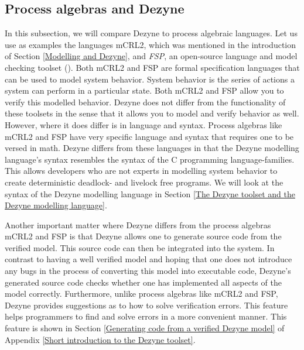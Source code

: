 \documentclass[12pt]{scrreprt}
\begin{document}
\subsection{Process algebras and Dezyne}
\label{Process algebras and Dezyne}
In this subsection, we will compare Dezyne to process algebraic languages. Let us use as examples the languages mCRL2, which was mentioned in the introduction of Section \ref{Modelling and Dezyne}, and \textit{FSP}, an open-source language and model checking toolset (\cite{ltsa}). Both mCRL2 and FSP are formal specification languages that can be used to model system behavior. System behavior is the series of actions a system can perform in a particular state. Both mCRL2 and FSP allow you to verify this modelled behavior. Dezyne does not differ from the functionality of these toolsets in the sense that it allows you to model and verify behavior as well. However, where it does differ is in language and syntax. Process algebras like mCRL2 and FSP have very specific language and syntax that requires one to be versed in math. Dezyne differs from these languages in that the Dezyne modelling language's syntax resembles the syntax of the C programming language-families. This allows developers who are not experts in modelling system behavior to create deterministic deadlock- and livelock free programs. We will look at the syntax of the Dezyne modelling language in Section \ref{The Dezyne toolset and the Dezyne modelling language}.
\par
Another important matter where Dezyne differs from the process algebras mCRL2 and FSP is that Dezyne allows one to generate source code from the verified model. This source code can then be integrated into the system. In contrast to having a well verified model and hoping that one does not introduce any bugs in the process of converting this model into executable code, Dezyne's generated source code checks whether one has implemented all aspects of the model correctly. Furthermore, unlike process algebras like mCRL2 and FSP, Dezyne provides suggestions as to how to solve verification errors. This feature helps programmers to find and solve errors in a more convenient manner. This feature is shown in Section \ref{Generating code from a verified Dezyne model} of Appendix \ref{Short introduction to the Dezyne toolset}.
\end{document}
